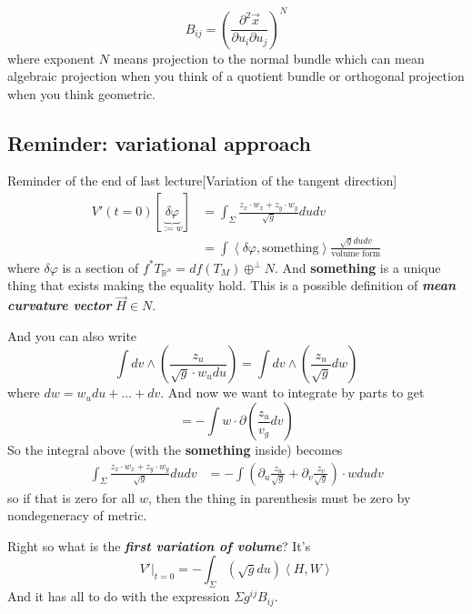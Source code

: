 \begin{claim}\leavevmode
\[B_{ij}=\left(\frac{\partial^2 \vec{x}}{\partial u_i\partial u_j}\right)^N \]
where exponent \(N\) means projection to the normal bundle which can mean algebraic projection when you think of a quotient bundle or orthogonal projection when you think geometric.
\end{claim}

\subsection{Reminder: variational approach}

\begin{thing6}{Reminder of the end of last lecture}[Variation of the tangent direction]\leavevmode
	\begin{align*}V'(t=0)[\underbrace{\delta \varphi}_{:=w}]&= \int_{\Sigma}\frac{z_x\cdot w_x+z_y\cdot w_y}{\sqrt{g} }dudv\\
		&=\int \left<\delta \varphi,\text{something} \right>\frac{\sqrt{g} dudv}{\text{volume form} }
	\end{align*}
where \(\delta \varphi\) is a section of \(f^* T_{\mathbb{R}^n}=df(T_M) \oplus^\perp N\). And \textbf{something} is a unique thing that exists making the equality hold. This is a possible definition of \textit{\textbf{mean curvature vector}} \(\vec{H} \in N\).

And you can also write
\[\int dv \wedge \left(\frac{z_u}{\sqrt{g} \cdot w_u du}\right) = \int dv \wedge \left(\frac{z_u}{\sqrt{g} }dw\right) \]
where \(dw=w_u du+\ldots+dv\). And now we want to integrate by parts to get
\[=-\int w \cdot \partial\left(\frac{z_u}{v_g}dv\right) \]
So the integral above (with the \textbf{something} inside) becomes
\begin{align*}
\int_{\Sigma}\frac{z_x\cdot w_x+z_y\cdot w_y}{\sqrt{g} }dudv&=-\int \left(\partial_u \frac{z_u}{\sqrt{g}}+\partial_v \frac{z_v}{\sqrt{g}}  \right)\cdot w du dv
\end{align*}
so if that is zero for all \(w\), then the thing in parenthesis must be zero by nondegeneracy of metric.
\end{thing6}

Right so what is the \textit{\textbf{first variation of volume}}? It's
\[V'|_{t=0}=-\int_\Sigma(\sqrt{g} du) \left<H,W\right>\]
And it has all to do with the expression \(\Sigma g^{ij}B_{ij}\).




\clearpage

